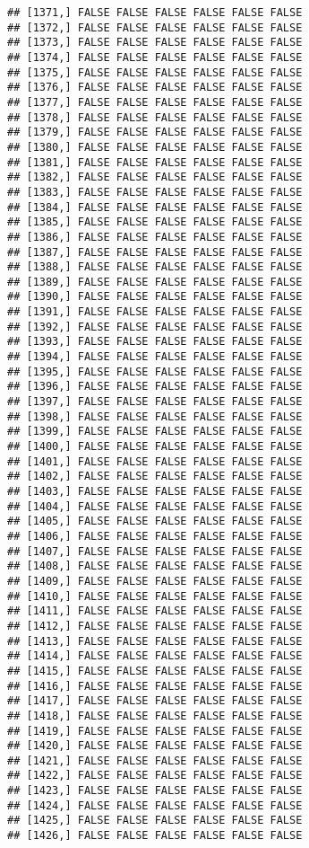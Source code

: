 \documentclass[
]{article}
\begin{document}
\begin{verbatim}
## [1371,] FALSE FALSE FALSE FALSE FALSE FALSE
## [1372,] FALSE FALSE FALSE FALSE FALSE FALSE
## [1373,] FALSE FALSE FALSE FALSE FALSE FALSE
## [1374,] FALSE FALSE FALSE FALSE FALSE FALSE
## [1375,] FALSE FALSE FALSE FALSE FALSE FALSE
## [1376,] FALSE FALSE FALSE FALSE FALSE FALSE
## [1377,] FALSE FALSE FALSE FALSE FALSE FALSE
## [1378,] FALSE FALSE FALSE FALSE FALSE FALSE
## [1379,] FALSE FALSE FALSE FALSE FALSE FALSE
## [1380,] FALSE FALSE FALSE FALSE FALSE FALSE
## [1381,] FALSE FALSE FALSE FALSE FALSE FALSE
## [1382,] FALSE FALSE FALSE FALSE FALSE FALSE
## [1383,] FALSE FALSE FALSE FALSE FALSE FALSE
## [1384,] FALSE FALSE FALSE FALSE FALSE FALSE
## [1385,] FALSE FALSE FALSE FALSE FALSE FALSE
## [1386,] FALSE FALSE FALSE FALSE FALSE FALSE
## [1387,] FALSE FALSE FALSE FALSE FALSE FALSE
## [1388,] FALSE FALSE FALSE FALSE FALSE FALSE
## [1389,] FALSE FALSE FALSE FALSE FALSE FALSE
## [1390,] FALSE FALSE FALSE FALSE FALSE FALSE
## [1391,] FALSE FALSE FALSE FALSE FALSE FALSE
## [1392,] FALSE FALSE FALSE FALSE FALSE FALSE
## [1393,] FALSE FALSE FALSE FALSE FALSE FALSE
## [1394,] FALSE FALSE FALSE FALSE FALSE FALSE
## [1395,] FALSE FALSE FALSE FALSE FALSE FALSE
## [1396,] FALSE FALSE FALSE FALSE FALSE FALSE
## [1397,] FALSE FALSE FALSE FALSE FALSE FALSE
## [1398,] FALSE FALSE FALSE FALSE FALSE FALSE
## [1399,] FALSE FALSE FALSE FALSE FALSE FALSE
## [1400,] FALSE FALSE FALSE FALSE FALSE FALSE
## [1401,] FALSE FALSE FALSE FALSE FALSE FALSE
## [1402,] FALSE FALSE FALSE FALSE FALSE FALSE
## [1403,] FALSE FALSE FALSE FALSE FALSE FALSE
## [1404,] FALSE FALSE FALSE FALSE FALSE FALSE
## [1405,] FALSE FALSE FALSE FALSE FALSE FALSE
## [1406,] FALSE FALSE FALSE FALSE FALSE FALSE
## [1407,] FALSE FALSE FALSE FALSE FALSE FALSE
## [1408,] FALSE FALSE FALSE FALSE FALSE FALSE
## [1409,] FALSE FALSE FALSE FALSE FALSE FALSE
## [1410,] FALSE FALSE FALSE FALSE FALSE FALSE
## [1411,] FALSE FALSE FALSE FALSE FALSE FALSE
## [1412,] FALSE FALSE FALSE FALSE FALSE FALSE
## [1413,] FALSE FALSE FALSE FALSE FALSE FALSE
## [1414,] FALSE FALSE FALSE FALSE FALSE FALSE
## [1415,] FALSE FALSE FALSE FALSE FALSE FALSE
## [1416,] FALSE FALSE FALSE FALSE FALSE FALSE
## [1417,] FALSE FALSE FALSE FALSE FALSE FALSE
## [1418,] FALSE FALSE FALSE FALSE FALSE FALSE
## [1419,] FALSE FALSE FALSE FALSE FALSE FALSE
## [1420,] FALSE FALSE FALSE FALSE FALSE FALSE
## [1421,] FALSE FALSE FALSE FALSE FALSE FALSE
## [1422,] FALSE FALSE FALSE FALSE FALSE FALSE
## [1423,] FALSE FALSE FALSE FALSE FALSE FALSE
## [1424,] FALSE FALSE FALSE FALSE FALSE FALSE
## [1425,] FALSE FALSE FALSE FALSE FALSE FALSE
## [1426,] FALSE FALSE FALSE FALSE FALSE FALSE

\end{verbatim}
\end{document}
